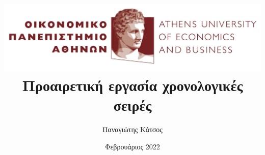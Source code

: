 \documentclass[17pt]{extarticle}
\title{\includegraphics[scale = 0.5]{images/aueb.jpg}\\
\Large Προαιρετική εργασία χρονολογικές σειρές}
\author{Παναγιώτης Κάτσος}
\date{Φεβρουάριος 2022}
\begin{document}
\begin{titlepage}
  \maketitle
\end{titlepage}
\end{document}
